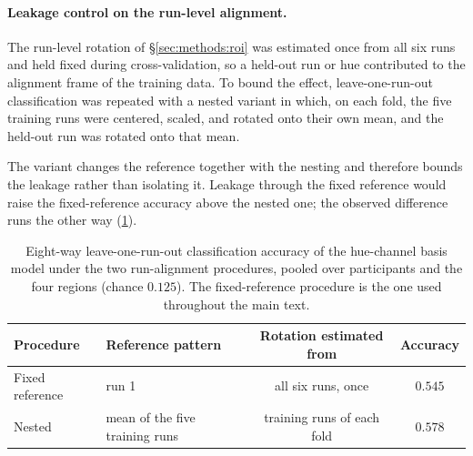 

\paragraph{Leakage control on the run-level alignment.}
The run-level rotation of \S\ref{sec:methods:roi} was estimated once from all six runs and held fixed during cross-validation, so a held-out run or hue contributed to the alignment frame of the training data. To bound the effect, leave-one-run-out classification was repeated with a nested variant in which, on each fold, the five training runs were centered, scaled, and rotated onto their own mean, and the held-out run was rotated onto that mean.

The variant changes the reference together with the nesting and therefore bounds the leakage rather than isolating it. Leakage through the fixed reference would raise the fixed-reference accuracy above the nested one; the observed difference runs the other way (\cref{tab:cv_leakage}).

\begin{table}[h]
\centering
\caption{Eight-way leave-one-run-out classification accuracy of the hue-channel basis model under the two run-alignment procedures, pooled over participants and the four regions (chance $0.125$). The fixed-reference procedure is the one used throughout the main text.}
\label{tab:cv_leakage}
\begin{tabular}{llcc}
\toprule
Procedure & Reference pattern & Rotation estimated from & Accuracy \\
\midrule
Fixed reference & run 1 & all six runs, once & $0.545$ \\
Nested & mean of the five training runs & training runs of each fold & $0.578$ \\
\bottomrule
\end{tabular}
\end{table}

